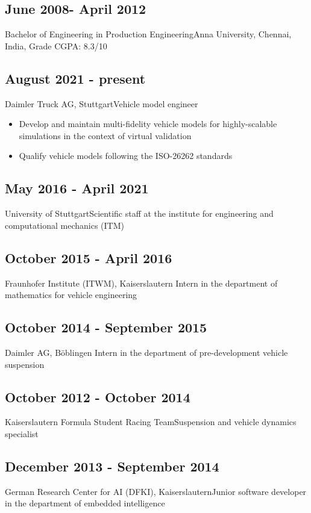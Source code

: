 \documentclass{mycv}
\begin{document}
\begin{paracol}{2}
		\subsection{June 2008- April 2012}{Bachelor of Engineering in
			Production Engineering}{Anna University, Chennai, India, {Grade CGPA: 8.3/10}}\\

  \subsection{August 2021 - present}{Daimler Truck AG, Stuttgart}{Vehicle model engineer}
		\begin{itemize}
			\item Develop and maintain multi-fidelity vehicle models for highly-scalable simulations in the context of
        virtual validation
		  \item Qualify vehicle models following the ISO-26262 standards 
		\end{itemize}
  
  \subsection{May 2016 - April 2021}{University of Stuttgart}{Scientific staff at the institute for engineering and
  	computational \quad\quad mechanics (ITM)}
    	  \begin{itemize}
    		\end{itemize}
    \subsection{October 2015 - April 2016}{Fraunhofer Institute (ITWM), Kaiserslautern}
    {Intern in the department of mathematics for vehicle engineering}
    	  \begin{itemize}
    		\end{itemize}
    \subsection{October 2014 - September 2015}{Daimler AG, B{\"o}blingen}
    {Intern in the department of pre-development
    	vehicle suspension}
    	  \begin{itemize}
    		\end{itemize}
		\subsection{October 2012 - October 2014}{Kaiserslautern Formula Student Racing Team}{Suspension and vehicle dynamics specialist} 
	  \begin{itemize}
	  \end{itemize}
		\subsection{December 2013 - September 2014}{German Research Center for
			AI (DFKI), Kaiserslautern}{Junior software developer in the department of embedded intelligence} 
	  \begin{itemize}
	  \end{itemize}
\end{paracol}
\end{document}
